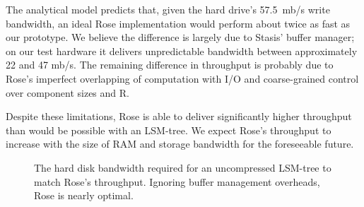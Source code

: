 \documentclass{vldb}
\newcommand{\rows}{Rose\xspace}
\newcommand{\rowss}{Rose's\xspace}
\begin{document}
The analytical model predicts that, given the hard drive's 57.5~mb/s write
bandwidth, an ideal \rows implementation would perform about twice as
fast as our prototype.  We believe the difference is largely due to
Stasis' buffer manager; on our test hardware it delivers unpredictable
bandwidth between approximately 22 and 47 mb/s.  The remaining
difference in throughput is probably due to \rowss imperfect
overlapping of computation with I/O and coarse-grained control over
component sizes and R.

Despite these limitations, \rows is able to deliver significantly
higher throughput than would be possible with an LSM-tree.  We expect
\rowss throughput to increase with the size of RAM and storage
bandwidth for the foreseeable future.





\begin{figure}
\centering
{}
\caption{The hard disk bandwidth required for an uncompressed LSM-tree
  to match \rowss throughput.  Ignoring buffer management overheads,
  \rows is nearly optimal.}
\label{fig:4R}
\end{figure}
\end{document}

